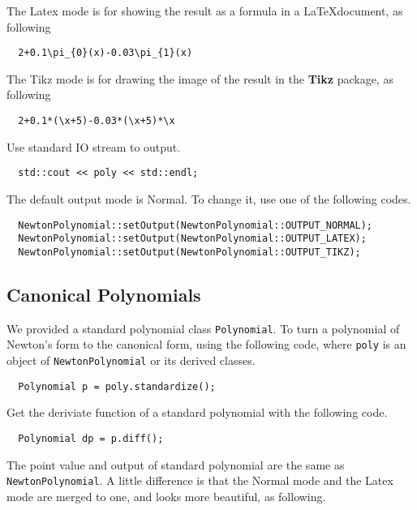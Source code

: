 \documentclass[11pt,en]{elegantpaper}
\begin{document}
The Latex mode is for showing the result as a formula in a \LaTeX document, as following

\begin{lstlisting}
  2+0.1\pi_{0}(x)-0.03\pi_{1}(x)
\end{lstlisting}

The Tikz mode is for drawing the image of the result in the \textbf{Tikz} package, as following

\begin{lstlisting}
  2+0.1*(\x+5)-0.03*(\x+5)*\x
\end{lstlisting}

Use standard IO stream to output.

\begin{lstlisting}
  std::cout << poly << std::endl;
\end{lstlisting}

The default output mode is Normal. To change it, use one of the following codes.

\begin{lstlisting}
  NewtonPolynomial::setOutput(NewtonPolynomial::OUTPUT_NORMAL);
  NewtonPolynomial::setOutput(NewtonPolynomial::OUTPUT_LATEX);
  NewtonPolynomial::setOutput(NewtonPolynomial::OUTPUT_TIKZ);
\end{lstlisting}

\subsection{Canonical Polynomials}

We provided a standard polynomial class \verb|Polynomial|. To turn a polynomial of Newton's form to the canonical form, using the following code, where \verb|poly| is an object of \verb|NewtonPolynomial| or its derived classes.

\begin{lstlisting}
  Polynomial p = poly.standardize();
\end{lstlisting}

Get the deriviate function of a standard polynomial with the following code.

\begin{lstlisting}
  Polynomial dp = p.diff();
\end{lstlisting}

The point value and output of standard polynomial are the same as \verb|NewtonPolynomial|. A little difference is that the Normal mode and the Latex mode are merged to one, and looks more beautiful, as following.
\end{document}
